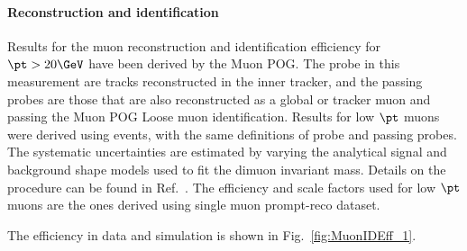 \paragraph*{Reconstruction and identification}

Results for the muon reconstruction and identification efficiency for $\pt > 20\GeV$
have been derived by the Muon POG.
The probe in this measurement are tracks reconstructed in the inner tracker, and
the passing probes are those that are also reconstructed as a global or tracker muon 
and passing the Muon POG Loose muon identification.
%
Results for low $\pt$ muons were derived using \JPsi events, with the same definitions
of probe and passing probes. The systematic uncertainties are estimated by varying the analytical signal and background shape models used to fit 
the dimuon invariant mass. Details on the procedure can be found in Ref.~\cite{AN-15-277}. The efficiency and scale 
factors used for low $\pt$ muons are the ones derived using single muon prompt-reco dataset.

The efficiency in data and simulation is shown in Fig.~\ref{fig:MuonIDEff_1}. 



